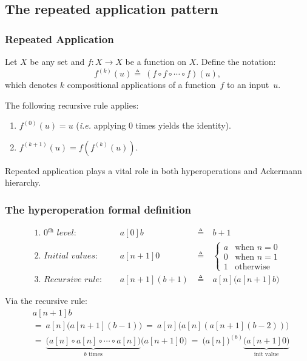 \subsection{The repeated application pattern}

\begin{frame}
\frametitle{Repeated Application}

Let $X$ be any set and $f: X\to X$ be a function on $X$. Define the notation:
\begin{equation*}
f^{(k)}(u) \triangleq ~ (f\circ f\circ \cdots \circ f)(u),
\end{equation*}
which denotes $k$ compositional applications of a function~$f$ to an
input~$u$.

\bigskip

The following recursive rule applies:
\begin{enumerate}
	\item $f^{(0)}(u) = u$ (\emph{i.e.} applying $0$ times yields the identity).
	\item $f^{(k+1)}(u) = f \left(f^{(k)}(u)\right)$.
\end{enumerate}

\bigskip

Repeated application plays a vital role in both hyperoperations and Ackermann hierarchy.


\end{frame}


\begin{frame}
\frametitle{The hyperoperation formal definition}
\begin{equation*}
\begin{array}{lrcl}
\textit{1. 0$^{\textit{th}}$ level: } & a[0]b & ~ \triangleq ~ & b + 1 \\
\textit{2. Initial values: } & a[n+1]0 & ~ \triangleq ~ &
\begin{cases}
a & \text{when } n = 0 \\
0 & \text{when } n = 1 \\
1 & \text{otherwise}
\end{cases} \\
\textit{3. Recursive rule: } \quad & a[n+1](b+1) & ~ \triangleq ~ & a[n]\big(a[n+1]b\big)
\end{array}
\end{equation*}

Via the recursive rule:
\begin{equation*}
\begin{aligned}
& a[n+1]b \\
& = ~ a[n]\big(a[n+1](b-1)\big) ~ = ~ a[n]\big(a[n](a[n+1](b-2))\big) \\
& = ~ \underbrace{\big( a[n]\circ a[n]\circ \cdots \circ a[n] \big)}_{b \text{ times}} \big(a[n+1]0\big)  ~ = ~ \big(a[n]\big)^{(b)}\underbrace{\big(a[n+1]0\big)}_{\text{init value}}
\end{aligned}
\end{equation*}

\end{frame}


